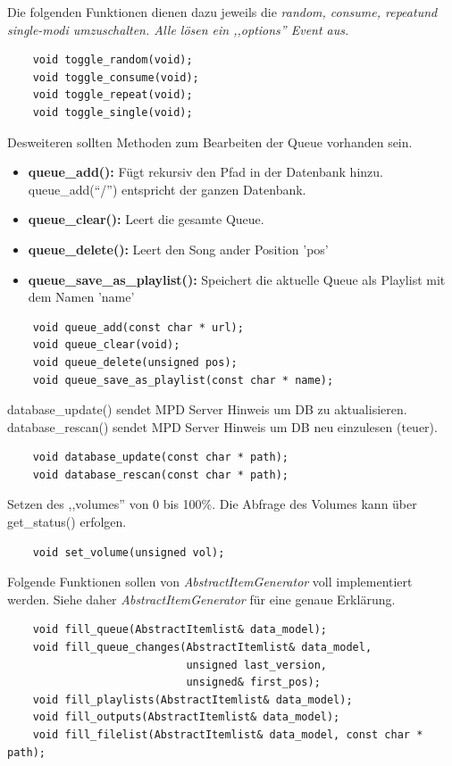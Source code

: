 Die folgenden Funktionen dienen dazu jeweils die \it random, consume, repeat\rm und \textit{single}-modi umzuschalten.
Alle lösen ein ,,options'' Event aus.
\begin{verbatim}
    void toggle_random(void);
    void toggle_consume(void);
    void toggle_repeat(void);
    void toggle_single(void);
\end{verbatim}

Desweiteren sollten Methoden zum Bearbeiten der Queue vorhanden sein.
\begin{itemize}
    \item \textbf{queue\_add():} Fügt rekursiv den Pfad in der Datenbank hinzu. queue\_add(``/'') entspricht der ganzen Datenbank.
    \item \textbf{queue\_clear():} Leert die gesamte Queue.
    \item \textbf{queue\_delete():} Leert den Song ander Position 'pos'
    \item \textbf{queue\_save\_as\_playlist():} Speichert die aktuelle Queue als Playlist mit dem Namen 'name'
\end{itemize}
\begin{verbatim}
    void queue_add(const char * url);
    void queue_clear(void);
    void queue_delete(unsigned pos);
    void queue_save_as_playlist(const char * name);
\end{verbatim}

database\_update() sendet MPD Server Hinweis um DB zu aktualisieren.
database\_rescan() sendet MPD Server Hinweis um DB neu einzulesen (teuer).
\begin{verbatim}
    void database_update(const char * path);
    void database_rescan(const char * path);
\end{verbatim}

Setzen des ,,volumes'' von 0 bis 100\%.
Die Abfrage des Volumes kann über get\_status() erfolgen.
\begin{verbatim}
    void set_volume(unsigned vol);
\end{verbatim}

Folgende Funktionen sollen von \emph{AbstractItemGenerator} voll implementiert werden.
Siehe daher \emph{AbstractItemGenerator} für eine genaue Erklärung.
\begin{verbatim}
    void fill_queue(AbstractItemlist& data_model);
    void fill_queue_changes(AbstractItemlist& data_model,
                            unsigned last_version,
                            unsigned& first_pos);
    void fill_playlists(AbstractItemlist& data_model);
    void fill_outputs(AbstractItemlist& data_model);
    void fill_filelist(AbstractItemlist& data_model, const char * path);
\end{verbatim}

